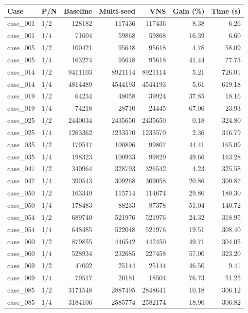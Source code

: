 \begin{tabular}{llrrrrr}
\toprule
Case & P/N & Baseline & Multi-seed & VNS & Gain (\%) & Time (s) \\
\midrule
case\_001 & 1/2 & 128182 & 117436 & 117436 & 8.38 & 6.26 \\
case\_001 & 1/4 & 71604 & 59868 & 59868 & 16.39 & 6.60 \\
case\_005 & 1/2 & 100421 & 95618 & 95618 & 4.78 & 58.09 \\
case\_005 & 1/4 & 163274 & 95618 & 95618 & 41.44 & 77.73 \\
case\_014 & 1/2 & 9411103 & 8921114 & 8921114 & 5.21 & 726.01 \\
case\_014 & 1/4 & 4814489 & 4544193 & 4544193 & 5.61 & 619.18 \\
case\_019 & 1/2 & 64234 & 48058 & 39924 & 37.85 & 18.16 \\
case\_019 & 1/4 & 74218 & 28710 & 24445 & 67.06 & 23.93 \\
case\_025 & 1/2 & 2440034 & 2435650 & 2435650 & 0.18 & 324.80 \\
case\_025 & 1/4 & 1263362 & 1233570 & 1233570 & 2.36 & 316.79 \\
case\_035 & 1/2 & 179547 & 100896 & 99807 & 44.41 & 165.09 \\
case\_035 & 1/4 & 198323 & 100933 & 99829 & 49.66 & 163.28 \\
case\_047 & 1/2 & 340964 & 328793 & 326542 & 4.23 & 325.58 \\
case\_047 & 1/4 & 390543 & 309268 & 309058 & 20.86 & 300.87 \\
case\_050 & 1/2 & 163349 & 115714 & 114674 & 29.80 & 180.30 \\
case\_050 & 1/4 & 178483 & 88233 & 87378 & 51.04 & 140.72 \\
case\_054 & 1/2 & 689740 & 521976 & 521976 & 24.32 & 318.95 \\
case\_054 & 1/4 & 648485 & 522048 & 521976 & 19.51 & 308.40 \\
case\_060 & 1/2 & 879855 & 446542 & 442450 & 49.71 & 304.05 \\
case\_060 & 1/4 & 528934 & 232685 & 227458 & 57.00 & 323.20 \\
case\_069 & 1/2 & 47002 & 25144 & 25144 & 46.50 & 9.41 \\
case\_069 & 1/4 & 79517 & 20181 & 18504 & 76.73 & 51.25 \\
case\_085 & 1/2 & 3171548 & 2887495 & 2848641 & 10.18 & 306.12 \\
case\_085 & 1/4 & 3184106 & 2585774 & 2582174 & 18.90 & 306.82 \\

\end{tabular}
